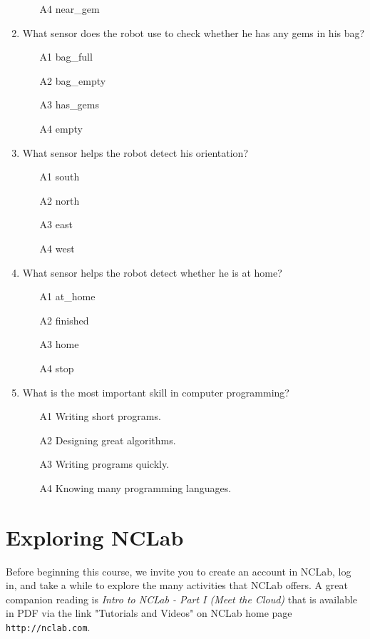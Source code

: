 \documentclass[article,A4,12pt]{llncs}
\begin{document}
\begin{enumerate}
\begin{enumerate}
\item[A4] near\_gem
\end{enumerate}
\item What sensor does the robot use to check whether he has any gems in his bag?
\begin{enumerate}
\item[A1] bag\_full
\item[A2] bag\_empty
\item[A3] has\_gems
\item[A4] empty
\end{enumerate}
\item What sensor helps the robot detect his orientation?
\begin{enumerate}
\item[A1] south
\item[A2] north
\item[A3] east
\item[A4] west
\end{enumerate}
\item What sensor helps the robot detect whether he is at home?
\begin{enumerate}
\item[A1] at\_home
\item[A2] finished
\item[A3] home
\item[A4] stop
\end{enumerate}
\item What is the most important skill in computer programming?
\begin{enumerate}
\item[A1] Writing short programs.
\item[A2] Designing great algorithms.
\item[A3] Writing programs quickly.
\item[A4] Knowing many programming languages.
\end{enumerate}
\end{enumerate}

\section{Exploring NCLab}

Before beginning this course, we invite you to create an account in 
NCLab, log in, and take a while to explore the many activities 
that NCLab offers. A great companion reading is {\em Intro to NCLab - Part I 
(Meet the Cloud)} that is available in PDF via the link "Tutorials and Videos"
on NCLab home page {\tt http://nclab.com}.\\
\end{document}
